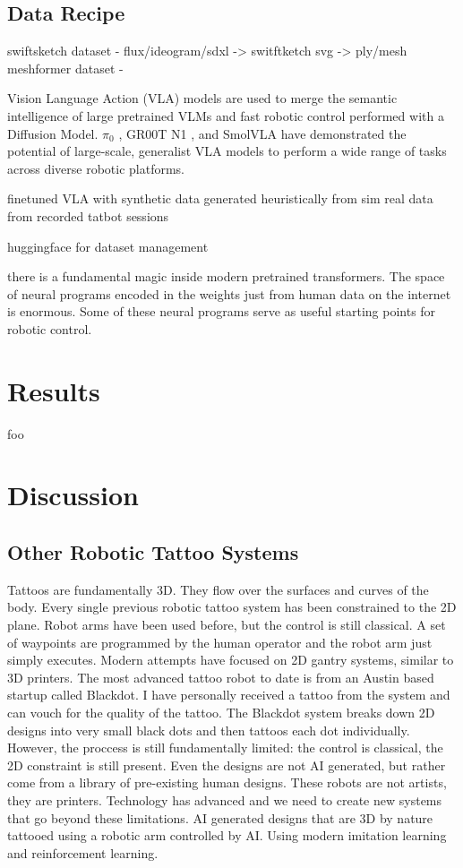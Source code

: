 \documentclass[11pt]{article}
\begin{document}
\subsection{Data Recipe}

swiftsketch dataset - flux/ideogram/sdxl -> switftketch svg -> ply/mesh
meshformer dataset -

Vision Language Action (VLA) models are used to merge the semantic intelligence of large pretrained VLMs and fast robotic control performed with a Diffusion Model.
$\pi_0$ \cite{Black2024pi0}, GR00T N1 \cite{Bjorck2025gr00t}, and SmolVLA \cite{Shukor2025smolvla} have demonstrated the potential of large-scale, generalist VLA models to perform a wide range of tasks across diverse robotic platforms.


finetuned VLA with 
synthetic data generated heuristically from sim
real data from recorded tatbot sessions

huggingface for dataset management

there is a fundamental magic inside modern pretrained transformers.
The space of neural programs encoded in the weights just from human data on the internet is enormous. 
Some of these neural programs serve as useful starting points for robotic control.

\section{Results}

foo

\section{Discussion}

\subsection{Other Robotic Tattoo Systems}

Tattoos are fundamentally 3D.
They flow over the surfaces and curves of the body.
Every single previous robotic tattoo system has been constrained to the 2D plane.
Robot arms have been used before, but the control is still classical.
A set of waypoints are programmed by the human operator and the robot arm just simply executes.
Modern attempts have focused on 2D gantry systems, similar to 3D printers.
The most advanced tattoo robot to date is from an Austin based startup called Blackdot.
I have personally received a tattoo from the system and can vouch for the quality of the tattoo.
The Blackdot system breaks down 2D designs into very small black dots and then tattoos each dot individually.
However, the proccess is still fundamentally limited: the control is classical, the 2D constraint is still present.
Even the designs are not AI generated, but rather come from a library of pre-existing human designs.
These robots are not artists, they are printers.
Technology has advanced and we need to create new systems that go beyond these limitations.
AI generated designs that are 3D by nature tattooed using a robotic arm controlled by AI.
Using modern imitation learning and reinforcement learning.
\end{document}
